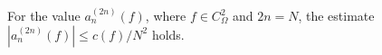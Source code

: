 \begin{lemma}
	\label{Lemma_af_est}For the value $a_{n}^{(2n)}(f)$, where $f\in C_{\Omega}^{2}$ and $2n=N$, the estimate $\left|a_{n}^{(2n)}(f)\right|\leq{c(f)}/{N^{2}}$
	holds.
\end{lemma}

